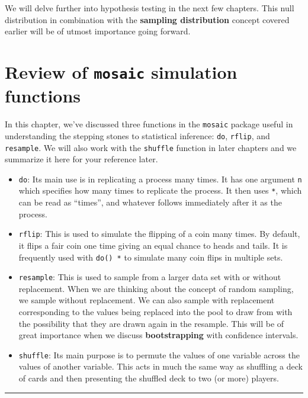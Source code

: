 \documentclass[]{tufte-book}
\let\oldrule=\rule
\renewcommand{\rule}[1]{\oldrule{\linewidth}}
\theoremstyle{definition}
\theoremstyle{definition}
\theoremstyle{remark}
\begin{document}
We will delve further into hypothesis testing in the next few chapters.
This null distribution in combination with the \textbf{sampling
distribution} concept covered earlier will be of utmost importance going
forward.

\section{\texorpdfstring{Review of \texttt{mosaic} simulation
functions}{Review of mosaic simulation functions}}\label{review-of-mosaic-simulation-functions}

In this chapter, we've discussed three functions in the \texttt{mosaic}
package useful in understanding the stepping stones to statistical
inference: \texttt{do}, \texttt{rflip}, and \texttt{resample}. We will
also work with the \texttt{shuffle} function in later chapters and we
summarize it here for your reference later.

\begin{itemize}
\item
  \texttt{do}: Its main use is in replicating a process many times. It
  has one argument \texttt{n} which specifies how many times to
  replicate the process. It then uses \texttt{*}, which can be read as
  ``times'', and whatever follows immediately after it as the process.
\item
  \texttt{rflip}: This is used to simulate the flipping of a coin many
  times. By default, it flips a fair coin one time giving an equal
  chance to heads and tails. It is frequently used with \texttt{do()\ *}
  to simulate many coin flips in multiple sets.
\item
  \texttt{resample}: This is used to sample from a larger data set with
  or without replacement. When we are thinking about the concept of
  random sampling, we sample without replacement. We can also sample
  with replacement corresponding to the values being replaced into the
  pool to draw from with the possibility that they are drawn again in
  the resample. This will be of great importance when we discuss
  \textbf{bootstrapping} with confidence intervals.
\item
  \texttt{shuffle}: Its main purpose is to permute the values of one
  variable across the values of another variable. This acts in much the
  same way as shuffling a deck of cards and then presenting the shuffled
  deck to two (or more) players.
\end{itemize}

\begin{center}\rule{0.5\linewidth}{\linethickness}\end{center}
\end{document}
